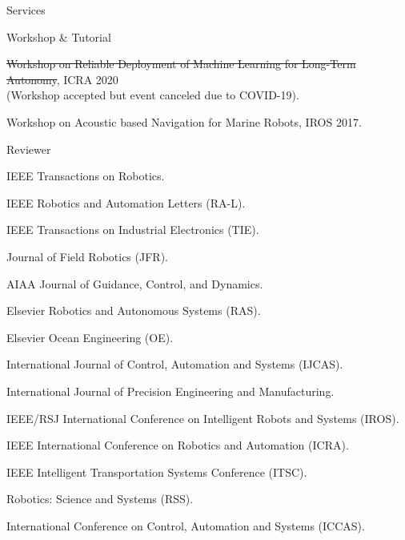 \begin{rSection}{Services}
\begin{rSubsection}{Workshop \& Tutorial}{}{}{}
  \item \sout{Workshop on Reliable Deployment of Machine Learning for Long-Term Autonomy}, ICRA 2020\\
  (Workshop accepted but event canceled due to COVID-19).
  \item Workshop on Acoustic based Navigation for Marine Robots, IROS 2017.
\end{rSubsection}

\begin{rSubsection}{Reviewer}{}{}{}
  \item IEEE Transactions on Robotics.
  \item IEEE Robotics and Automation Letters (RA-L).
  \item IEEE Transactions on Industrial Electronics (TIE).
  \item Journal of Field Robotics (JFR).
  \item AIAA Journal of Guidance, Control, and Dynamics.
  \item Elsevier Robotics and Autonomous Systems (RAS).
  \item Elsevier Ocean Engineering (OE).
  \item International Journal of Control, Automation and Systems (IJCAS).
  \item International Journal of Precision Engineering and Manufacturing.
  \item IEEE/RSJ International Conference on Intelligent Robots and Systems (IROS).
  \item IEEE International Conference on Robotics and Automation (ICRA).
  \item IEEE Intelligent Transportation Systems Conference (ITSC).
  \item Robotics: Science and Systems (RSS).
  \item International Conference on Control, Automation and Systems (ICCAS).
\end{rSubsection}


\end{rSection}
